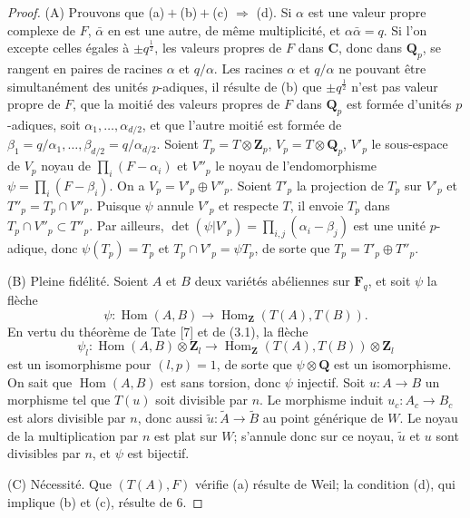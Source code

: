 \documentclass[10pt]{amsart}
\theoremstyle{plain}
\theoremstyle{remark}
\DeclareMathOperator{\Hom}{Hom}
\begin{document}
\begin{proof}
(A) Prouvons que (a)${}+{}$(b)${}+{}$(c) $\Rightarrow$ (d). Si $\alpha$
est une valeur propre complexe de $F$, $\bar{\alpha}$ en est une autre,
de m\^eme multiplicit\'e, et $\alpha\bar{\alpha} = q$. Si l'on excepte
celles \'egales \`a $\pm q^{\frac{1}{2}}$, les valeurs propres de $F$ dans
$\mathbf{C}$, donc dans $\mathbf{Q}_p$, se rangent en paires de racines
$\alpha$ et $q/\alpha$. Les racines $\alpha$ et $q/\alpha$ ne pouvant
\^etre simultan\'ement des unit\'es $p$-adiques, il r\'esulte de (b)
que $\pm q^{\frac{1}{2}}$ n'est pas valeur propre de $F$, que la
moiti\'e des valeurs propres de $F$ dans $\mathbf{Q}_p$ est form\'ee
d'unit\'es $p$-adiques, soit $\alpha_1, \dots, \alpha_{d/2}$, et que
l'autre moiti\'e est form\'ee de $\beta_1 = q/\alpha_1, \dots,
\beta_{d/2} = q/\alpha_{d/2}$. Soient $T_p = T \otimes \mathbf{Z}_p$,
$V_p = T \otimes \mathbf{Q}_p$, $V'_p$ le sous-espace de $V_p$ noyau de
$\prod_i (F - \alpha_i)$ et $V''_p$ le noyau de l'endomorphisme
$\psi = \prod_i (F - \beta_i)$. On a $V_p = V'_p \oplus V''_p$.
Soient $T'_p$ la projection de $T_p$ sur $V'_p$ et
$T''_p = T_p \cap V''_p$. Puisque $\psi$ annule $V'_p$ et respecte
$T$, il envoie $T_p$ dans $T_p \cap V''_p \subset T''_p$. Par ailleurs,
$\det(\psi|V'_p) = \prod_{i,j}(\alpha_i - \beta_j)$ est une unit\'e
$p$-adique, donc $\psi(T_p) = T_p$ et $T_p \cap V'_p = \psi T_p$, de
sorte que $T_p = T'_p \oplus T''_p$.

(B) Pleine fid\'elit\'e. Soient $A$ et $B$ deux vari\'et\'es ab\'eliennes
sur $\mathbf{F}_q$, et soit $\psi$ la fl\`eche
\[
\psi\colon \Hom(A, B) \longrightarrow \Hom_{\mathbf{Z}}(T(A), T(B)).
\]
En vertu du th\'eor\`eme de Tate [7] et de (3.1), la fl\`eche
\[
\psi_l\colon \Hom(A, B) \otimes \mathbf{Z}_l \longrightarrow
\Hom_{\mathbf{Z}}(T(A), T(B)) \otimes \mathbf{Z}_l
\]
est un isomorphisme pour $(l, p) = 1$, de sorte que $\psi \otimes
\mathbf{Q}$ est un isomorphisme. On sait que $\Hom(A, B)$ est sans
torsion, donc $\psi$ injectif. Soit $u\colon A \to B$ un morphisme tel
que $T(u)$ soit divisible par $n$. Le morphisme induit
$u_c\colon A_c \to B_c$ est alors divisible par $n$, donc aussi
$\tilde{u}\colon \tilde{A} \to \tilde{B}$ au point g\'en\'erique de $W$.
Le noyau de la multiplication par $n$ est plat sur $W$;
s'annule donc sur ce noyau, $\tilde{u}$ et $u$ sont divisibles par $n$,
et $\psi$ est bijectif.

(C) N\'ecessit\'e. Que $(T(A), F)$ v\'erifie (a) r\'esulte de Weil;
la condition (d), qui implique (b) et (c), r\'esulte de 6.


\end{proof}
\end{document}
